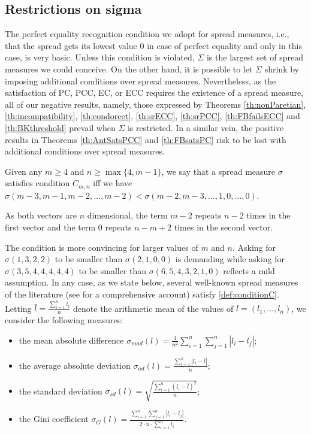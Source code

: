 \documentclass[version=3.21, pagesize, twoside=off, bibliography=totoc, DIV=calc, fontsize=12pt, a4paper]{scrartcl}
\begin{document}
\subsection{Restrictions on sigma}
\label{sec:RestrictionOnSigma}
The perfect equality recognition condition we adopt for spread measures, i.e., that the spread gets its lowest value $0$ in case of perfect equality and only in this case, is very basic. Unless this condition is violated, $\Sigma$ is the largest set of spread measures we could conceive. On the other hand, it is possible to let $\Sigma$ shrink by imposing additional conditions over spread measures. Nevertheless, as the satisfaction of PC, PCC, EC, or ECC requires the existence of a spread measure, all of our negative results, namely, those expressed by Theorems \ref{th:nonParetian}, \ref{th:incompatibility}, \ref{th:condorcet}, \ref{th:srECC}, \ref{th:srPCC}, \ref{th:FBfailsECC} and \ref{th:BKthreshold} prevail when $\Sigma$ is restricted. In a similar vein, the positive results in Theorems \ref{th:AntSatsPCC} and \ref{th:FBsatsPC} risk to be lost with additional conditions over spread measures.

\begin{definition}
	\label{def:conditionC}
	Given any $m\geq4$ and $n\geq \max\{4,m-1\}$, we say that a spread measure $\sigma$ satisfies condition $C_{m,n}$ iff we have $\sigma(m-3, m-1, m-2, \dots, m-2) < \sigma(m-2, m-3, \dots, 1, 0, \dots, 0)$.
\end{definition}

As both vectors are $n$ dimensional, the term $m-2$ repeats $n-2$ times in the first vector and the term $0$ repeats $n-m+2$ times in the second vector.

The condition is more convincing for larger values of $m$ and $n$. Asking for $\sigma(1,3,2,2)$ to be smaller than $\sigma(2,1,0,0)$ is demanding while asking for $\sigma(3,5,4,4,4,4,4)$ to be smaller than $\sigma(6,5,4,3,2,1,0)$ reflects a mild assumption. In any case, as we state below, several well-known spread measures of the literature (see \citet{Allison1978} for a comprehensive account) satisfy \cref{def:conditionC}. Letting $\bar{l}=\frac{\sum_{i=1}^{n}l_i}{n}$ denote the arithmetic mean of the values of $l = (l_1, …, l_n)$, we consider the following measures:

\begin{itemize}
	\item the mean absolute difference $\sigma_{mad}(l)= \frac{1}{n^2} \sum_{i=1}^{n}\sum_{j=1}^{n}|l_i-l_j|$;
	\item the average absolute deviation $\sigma_{ad}(l)= \frac{\sum_{i=1}^{n}|l_i-\bar{l}|}{n}$;
	\item the standard deviation $\sigma_{sd}(l)= \sqrt{\frac{\sum_{i=1}^{n}(l_i-\bar{l})^2}{n}}$;
	\item the Gini coefficient $\sigma_{G}(l)= \frac{\sum_{i=1}^{n}\sum_{j=1}^{n}|l_i-l_j|}{2 \cdot n \cdot \sum_{i=1}^{n} l_i}$.
\end{itemize} 
\end{document}

